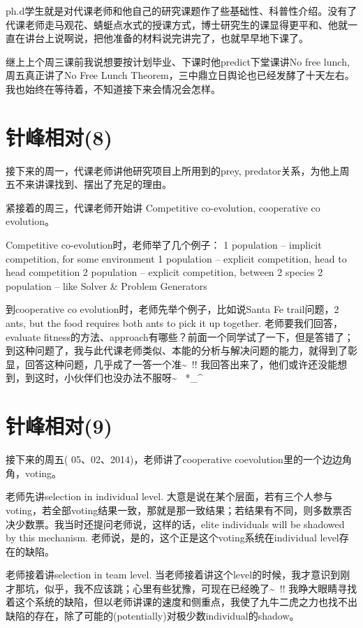 \documentclass[12pt]{book}
\begin{document}
ph.d学生就是对代课老师和他自己的研究课题作了些基础性、科普性介绍。没有了代课老师走马观花、蜻蜓点水式的授课方式，博士研究生的课显得更平和、他就一直在讲台上说啊说，把他准备的材料说完讲完了，也就早早地下课了。

继上上个周三课前我说想要按计划毕业、下课时他predict下堂课讲No free lunch, 周五真正讲了No Free Lunch Theorem，三中鼎立日舆论也已经发酵了十天左右。我也始终在等待着，不知道接下来会情况会怎样。

\section{针峰相对(8)}
\label{sec-34-8}

接下来的周一，代课老师讲他研究项目上所用到的prey, predator关系，为他上周五不来讲课找到、摆出了充足的理由。

紧接着的周三，代课老师开始讲 Competitive co-evolution, cooperative co evolution。

Competitive co-evolution时，老师举了几个例子：
1 population -- implicit competition, for some environment
1 population -- explicit competition, head to head competition
2 population -- explicit competition, between 2 species
2 population -- like Solver \& Problem Generators

到cooperative co evolution时，老师先举个例子，比如说Santa Fe trail问题，2 ants, but the food requires both ants to pick it up together. 老师要我们回答，evaluate fitness的方法、approach有哪些？前面一个同学试了一下，但是答错了；到这种问题了，我与此代课老师类似、本能的分析与解决问题的能力，就得到了彰显，回答这种问题，几乎成了一答一个准\textasciitilde{}~!! 我回答出来了，他们或许还没能想到，到这时，小伙伴们也没办法不服呀\textasciitilde{}~ *\_\^{}

\section{针峰相对(9)}
\label{sec-34-9}

接下来的周五( 05、02、2014)，老师讲了cooperative coevolution里的一个边边角角，voting。

老师先讲selection in individual level. 大意是说在某个层面，若有三个人参与voting，若全部voting结果一致，那就是那一致结果；若结果有不同，则多数票否决少数票。我当时还提问老师说，这样的话，elite individuals will be shadowed by this mechanism. 老师说，是的，这个正是这个voting系统在individual level存在的缺陷。

老师接着讲selection in team level. 当老师接着讲这个level的时候，我才意识到刚才那坑，似乎，我不应该跳；心里有些犹豫，可现在已经晚了\textasciitilde{}~!! 我睁大眼睛寻找着这个系统的缺陷，但以老师讲课的速度和侧重点，我使了九牛二虎之力也找不出缺陷的存在，除了可能的(potentially)对极少数individual的shadow。
\end{document}
